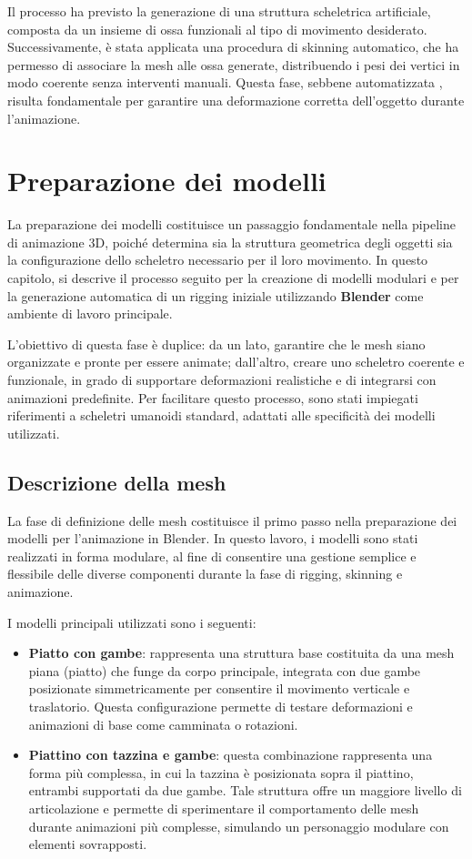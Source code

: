Il processo ha previsto la generazione di una struttura scheletrica artificiale, composta da un insieme di ossa funzionali al tipo di movimento desiderato. Successivamente, è stata applicata una procedura di skinning automatico, che ha permesso di associare la mesh alle ossa generate, distribuendo i pesi dei vertici in modo coerente senza interventi manuali. Questa fase, sebbene automatizzata , risulta fondamentale per garantire una deformazione corretta dell'oggetto durante l'animazione.

\section{Preparazione dei modelli}

La preparazione dei modelli costituisce un passaggio fondamentale nella pipeline di animazione 3D, poiché determina sia la struttura geometrica degli oggetti sia la configurazione dello scheletro necessario per il loro movimento. In questo capitolo, si descrive il processo seguito per la creazione di modelli modulari e per la generazione automatica di un rigging iniziale utilizzando \textbf{Blender} come ambiente di lavoro principale.

L'obiettivo di questa fase è duplice: da un lato, garantire che le mesh siano organizzate e pronte per essere animate; dall'altro, creare uno scheletro coerente e funzionale, in grado di supportare deformazioni realistiche e di integrarsi con animazioni predefinite. Per facilitare questo processo, sono stati impiegati riferimenti a scheletri umanoidi standard, adattati alle specificità dei modelli utilizzati.

\subsection{Descrizione della mesh}

La fase di definizione delle mesh costituisce il primo passo nella preparazione dei modelli per l'animazione in Blender. In questo lavoro, i modelli sono stati realizzati in forma modulare, al fine di consentire una gestione semplice e flessibile delle diverse componenti durante la fase di rigging, skinning e animazione.

I modelli principali utilizzati sono i seguenti: 
\begin{itemize}
    \item \textbf{Piatto con gambe}: rappresenta una struttura base costituita da una mesh piana (piatto) che funge da corpo principale, integrata con due gambe posizionate simmetricamente per consentire il movimento verticale e traslatorio. Questa configurazione permette di testare deformazioni e animazioni di base come camminata o rotazioni.
    \item \textbf{Piattino con tazzina e gambe}: questa combinazione rappresenta una forma più complessa, in cui la tazzina è posizionata sopra il piattino, entrambi supportati da due gambe. Tale struttura offre un maggiore livello di articolazione e permette di sperimentare il comportamento delle mesh durante animazioni più complesse, simulando un personaggio modulare con elementi sovrapposti.
\end{itemize}

